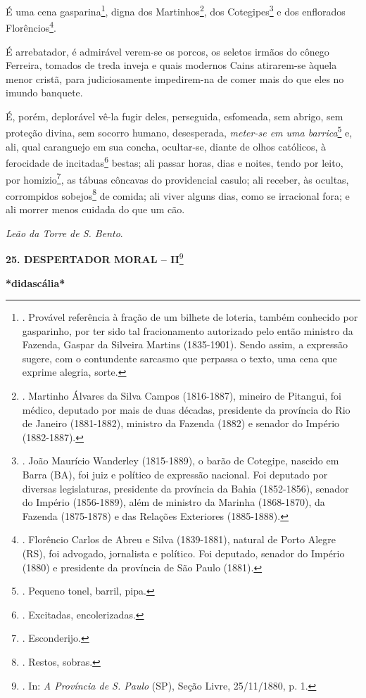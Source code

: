 É uma cena gasparina\footnote{. Provável referência à fração de um
  bilhete de loteria, também conhecido por gasparinho, por ter sido tal
  fracionamento autorizado pelo então ministro da Fazenda, Gaspar da
  Silveira Martins (1835-1901). Sendo assim, a expressão sugere, com o
  contundente sarcasmo que perpassa o texto, uma cena que exprime
  alegria, sorte.}, digna dos Martinhos\footnote{. Martinho Álvares da
  Silva Campos (1816-1887), mineiro de Pitangui, foi médico, deputado
  por mais de duas décadas, presidente da província do Rio de Janeiro
  (1881-1882), ministro da Fazenda (1882) e senador do Império
  (1882-1887).}, dos Cotegipes\footnote{. João Maurício Wanderley
  (1815-1889), o barão de Cotegipe, nascido em Barra (BA), foi juiz e
  político de expressão nacional. Foi deputado por diversas
  legislaturas, presidente da província da Bahia (1852-1856), senador do
  Império (1856-1889), além de ministro da Marinha (1868-1870), da
  Fazenda (1875-1878) e das Relações Exteriores (1885-1888).} e dos
enflorados Florêncios\footnote{. Florêncio Carlos de Abreu e Silva
  (1839-1881), natural de Porto Alegre (RS), foi advogado, jornalista e
  político. Foi deputado, senador do Império (1880) e presidente da
  província de São Paulo (1881).}.

É arrebatador, é admirável verem-se os porcos, os seletos irmãos do
cônego Ferreira, tomados de treda inveja e quais modernos Cains
atirarem-se àquela menor cristã, para judiciosamente impedirem-na de
comer mais do que eles no imundo banquete.

É, porém, deplorável vê-la fugir deles, perseguida, esfomeada, sem
abrigo, sem proteção divina, sem socorro humano, desesperada,
\emph{meter-se em uma barrica}\footnote{. Pequeno tonel, barril, pipa.}
e, ali, qual caranguejo em sua concha, ocultar-se, diante de olhos
católicos, à ferocidade de incitadas\footnote{. Excitadas,
  encolerizadas.} bestas; ali passar horas, dias e noites, tendo por
leito, por homizio\footnote{. Esconderijo.}, as tábuas côncavas do
providencial casulo; ali receber, às ocultas, corrompidos
sobejos\footnote{. Restos, sobras.}
de comida; ali viver alguns
dias, como se irracional fora; e ali morrer menos cuidada do que um cão.

\emph{Leão da Torre de S. Bento}.

\textbf{25. DESPERTADOR MORAL -- II}\footnote{. In: \emph{A Província de
  S. Paulo} (SP), Seção Livre, 25/11/1880, p. 1.}

\textbf{*didascália*}

